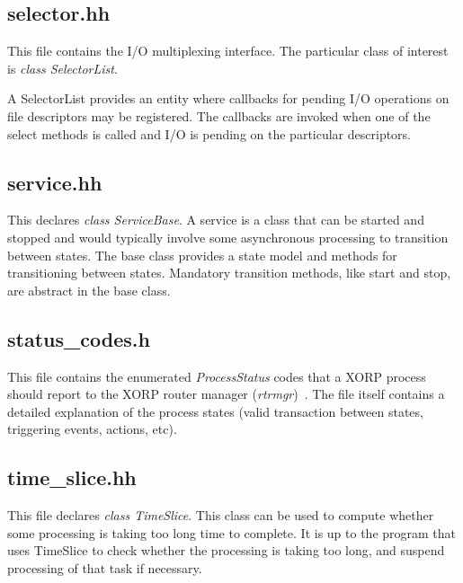 \documentclass[11pt]{article}
\begin{document}
\subsection{selector.hh}

This file contains the I/O multiplexing interface. The particular class
of interest is \emph{class SelectorList}.

A SelectorList provides an entity where callbacks for pending I/O
operations on file descriptors may be registered.  The callbacks
are invoked when one of the select methods is called and I/O
is pending on the particular descriptors.

\subsection{service.hh}

This declares \emph{class ServiceBase}.  A service is a class that can
be started and stopped and would typically involve some asynchronous
processing to transition between states.  The base class provides a
state model and methods for transitioning between states.  Mandatory
transition methods, like start and stop, are abstract in the base
class.

\subsection{status\_codes.h}

This file contains the enumerated \emph{ProcessStatus} codes
that a XORP process should report to the XORP router manager
(\emph{rtrmgr})~\cite{xorp:rtrmgr}.
The file itself contains a detailed explanation of the process states
(valid transaction between states, triggering events, actions, etc).

\subsection{time\_slice.hh}

This file declares \emph{class TimeSlice}.
This class can be used to compute whether some processing is taking
too long time to complete. It is up to the program that uses
TimeSlice to check whether the processing is taking too long,
and suspend processing of that task if necessary.

\end{document}
